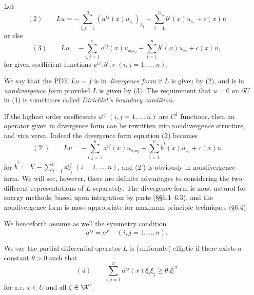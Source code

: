 \begin{definition}
\label{def:divergence-nondivergence-form}
Let
$$(2) \qquad Lu = -\sum_{i,j=1}^n \left(a^{ij}(x)u_{x_i}\right)_{x_j} + \sum_{i=1}^n b^i(x)u_{x_i} + c(x)u$$
or else
$$(3) \qquad Lu = -\sum_{i,j=1}^n a^{ij}(x)u_{x_ix_j} + \sum_{i=1}^n b^i(x)u_{x_i} + c(x)u,$$
for given coefficient functions $a^{ij}, b^i, c$ $(i,j=1,\ldots,n)$.

We say that the PDE $Lu = f$ is in \textit{divergence form} if $L$ is given by (2), and is in \textit{nondivergence form} provided $L$ is given by (3). The requirement that $u = 0$ on $\partial U$ in (1) is sometimes called \textit{Dirichlet's boundary condition}.
\end{definition}

\begin{remark}
\label{rem:elliptic-operator-form-conversion}
If the highest order coefficients $a^{ij}$ $(i,j=1,\ldots,n)$ are $C^1$ functions, then an operator given in divergence form can be rewritten into nondivergence structure, and vice versa. Indeed the divergence form equation (2) becomes
$$(2') \qquad Lu = -\sum_{i,j=1}^n a^{ij}(x)u_{x_ix_j} + \sum_{i=1}^n \tilde b^i(x)u_{x_i} + c(x)u$$
for $\tilde b^i := b^i - \sum_{j=1}^n a^{ij}_{x_j}$ $(i=1,\ldots,n)$, and (2') is obviously in nondivergence form. We will see, however, there are definite advantages to considering the two different representations of $L$ separately. The divergence form is most natural for energy methods, based upon integration by parts (\S\S6.1--6.3), and the nondivergence form is most appropriate for maximum principle techniques (\S6.4).
\end{remark}

We henceforth assume as well the symmetry condition
$$a^{ij} = a^{ji} \quad (i,j=1,\ldots,n).$$

\begin{definition}
\label{def:uniform-ellipticity}
We say the partial differential operator $L$ is (uniformly) elliptic if there exists a constant $\theta > 0$ such that
$$(4) \qquad \sum_{i,j=1}^n a^{ij}(x)\xi_i\xi_j \geq \theta|\xi|^2$$
for a.e. $x \in U$ and all $\xi \in \R^n$.
\end{definition}


